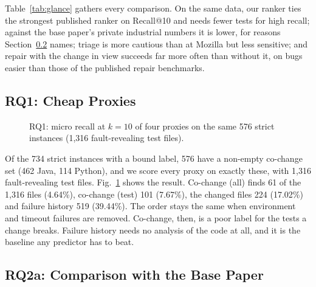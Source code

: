 \documentclass[10pt,conference]{IEEEtran}
\begin{document}
Table~\ref{tab:glance} gathers every comparison. On the same data, our ranker ties the strongest published ranker on Recall@10 and needs fewer tests for high recall; against the base paper's private industrial numbers it is lower, for reasons Section~\ref{sec:rq2a} names; triage is more cautious than at Mozilla but less sensitive; and repair with the change in view succeeds far more often than without it, on bugs easier than those of the published repair benchmarks.

\subsection{RQ1: Cheap Proxies}
\label{sec:rq1}

\begin{figure}[t]
\centering
{}
\caption{RQ1: micro recall at $k=10$ of four proxies on the same 576 strict instances (1,316 fault-revealing test files).}
\label{fig:rq1}
\end{figure}

Of the 734 strict instances with a bound label, 576 have a non-empty co-change set (462 Java, 114 Python), and we score every proxy on exactly these, with 1,316 fault-revealing test files. Fig.~\ref{fig:rq1} shows the result. Co-change (all) finds 61 of the 1,316 files (4.64\%), co-change (test) 101 (7.67\%), the changed files 224 (17.02\%) and failure history 519 (39.44\%). The order stays the same when environment and timeout failures are removed. Co-change, then, is a poor label for the tests a change breaks. Failure history needs no analysis of the code at all, and it is the baseline any predictor has to beat.

\subsection{RQ2a: Comparison with the Base Paper}
\label{sec:rq2a}
\end{document}
